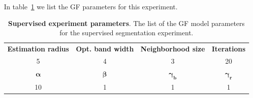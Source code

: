 \documentclass[smallextended]{svjour3}
\begin{document}
In table~\ref{tab:coco-experiment-parameter} we list the GF parameters for this experiment.

\begin{table}
\center
\begin{tabular}{cccc}
\textbf{Estimation radius} & \textbf{Opt. band width} & \textbf{Neighborhood size} & \textbf{Iterations} \\
5 & 4 & 3 & 20\\
\hline
$\boldsymbol{\alpha}$ & $\boldsymbol{\beta}$ & $\boldsymbol{\gamma_b}$ & $\boldsymbol{\gamma_r}$\\
10 & 1 & 1 & 1 \\
\hline
\end{tabular}
\caption{\textbf{Supervised experiment parameters}. The list of the GF model parameters for the supervised segmentation experiment.}
\label{tab:coco-experiment-parameter}
\end{table}
%
%
%
%
\end{document}
